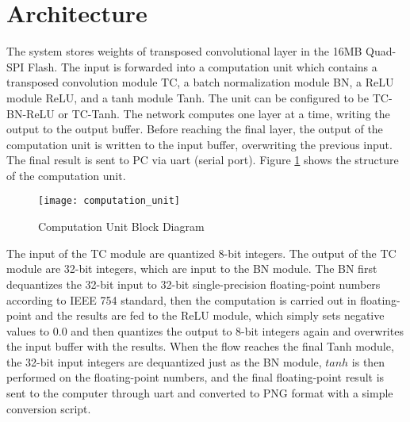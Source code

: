\section{Architecture}

The system stores weights of transposed convolutional layer in the 16MB Quad-SPI Flash. The input is
forwarded into a computation unit which contains a transposed convolution module TC,
a batch normalization module BN, a ReLU module ReLU, and a tanh module Tanh.
The unit can be configured to be TC-BN-ReLU or TC-Tanh. The network computes one
layer at a time, writing the output to the output buffer. Before reaching the final layer, the output of
the computation unit is written to the input buffer, overwriting the previous input. The final result is
sent to PC via \gls{uart} (serial port). Figure \ref{fig:computation_unit} shows the structure of the
computation unit.

\begin{figure}[h]
  \centering
  \texttt{[image: computation\_unit]}
  \caption{Computation Unit Block Diagram}
  \label{fig:computation_unit}
\end{figure}

The input of the TC module are quantized 8-bit integers. The output of the TC module are 32-bit
integers, which are input to the BN module. The BN first dequantizes the 32-bit input to 32-bit
single-precision floating-point numbers according to IEEE 754 standard, then the computation is carried
out in floating-point and the results are fed to the ReLU module, which simply sets negative values to
$0.0$ and then quantizes the output to 8-bit integers again and overwrites the input buffer with the
results. When the flow reaches the final Tanh module, the 32-bit input integers are dequantized just as the
BN module, $tanh$ is then performed on the floating-point numbers, and the final floating-point result is
sent to the computer through \gls{uart} and converted to PNG format with a simple conversion script.

\clearpage %
